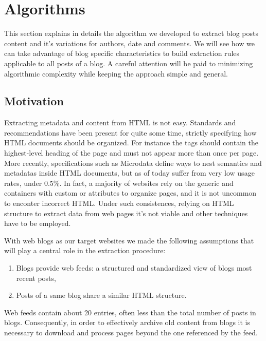 \section{Algorithms}

This section explains in details the algorithm we developed to extract blog posts content and it's variations for authors, date and comments. We will see how we can take advantage of blog specific characteristics to build extraction rules applicable to all posts of a blog. A careful attention will be paid to minimizing algorithmic complexity while keeping the approach simple and general.


\subsection{Motivation}
Extracting metadata and content from HTML is not easy. Standards and recommendations have been present for quite some time, strictly specifying how HTML documents should be organized. For instance the  tags should contain the highest-level heading of the page and must not appear more than once per page\cite{w3c2002}. More recently, specifications such as Microdata\cite{whatwg2013} define ways to nest semantics and metadatas inside HTML documents, but as of today suffer from very low usage rates, under 0.5\%\cite{andrewrogers2013}. In fact, a majority of websites rely on the generic  and  containers with custom  or  attributes to organize pages, and it is not uncommon to enconter incorrect HTML. Under such consistences, relying on HTML structure to extract data from web pages it's not viable and other techniques have to be employed.


With web blogs as our target websites we made the following assumptions that will play a central role in the extraction procedure:
\begin{enumerate}[label={(\arabic*)}]
  \item\label{havefeedAssum} Blogs provide web feeds: a structured and standardized view of blogs most recent posts,
  \item\label{similarhtmlAssum} Posts of a same blog share a similar HTML structure.
\end{enumerate}
Web feeds contain about 20 entries\cite{oita2010}, often less than the total number of posts in blogs. Consequently, in order to effectively archive old content from blogs it is necessary to download and process pages beyond the one referenced by the feed.


